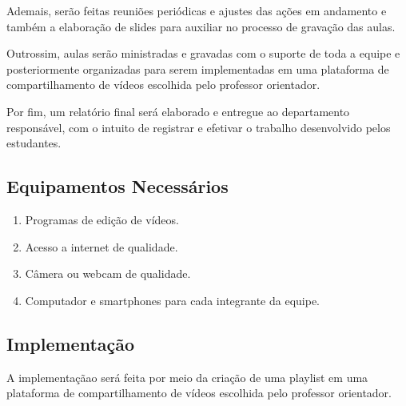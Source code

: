 \documentclass[a4paper,10pt]{article} %
\begin{document}
Ademais, serão feitas reuniões periódicas e ajustes das ações em andamento e também a elaboração de slides para auxiliar no processo de gravação das aulas.

Outrossim, aulas serão ministradas e gravadas com o suporte de toda a equipe e posteriormente organizadas para serem implementadas em uma plataforma de compartilhamento de vídeos escolhida  pelo  professor orientador.

Por fim, um relatório final será elaborado e entregue ao departamento responsável, com o intuito de registrar e efetivar o trabalho desenvolvido pelos estudantes.
 
\subsection{Equipamentos Necessários}

\begin{enumerate}
 \item Programas de edição de vídeos. 
 \item Acesso a internet de qualidade.
 \item Câmera ou webcam de qualidade.
 \item Computador e smartphones para cada integrante da equipe.
\end{enumerate}

\subsection{Implementação}
A implementaçãao será feita por meio da criação de uma playlist em uma plataforma de compartilhamento de vídeos escolhida pelo professor orientador.


\end{document}
